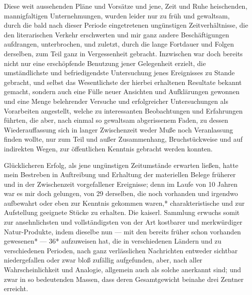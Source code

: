 \documentclass[a4paper, 11pt, oneside, german]{article}
\begin{document}
Diese weit aussehenden Pläne und Vorsätze und jene, Zeit und Ruhe heischenden, mannigfaltigen Unternehmungen, wurden leider nur zu früh und gewaltsam, durch die bald nach dieser Periode eingetretenen ungünstigen Zeitverhältnisse, die den literarischen Verkehr erschwerten und mir ganz andere Beschäftigungen aufdrangen, unterbrochen, und zuletzt, durch die lange Fortdauer und Folgen derselben, zum Teil ganz in Vergessenheit gebracht. Inzwischen war doch bereits nicht nur eine erschöpfende Benutzung jener Gelegenheit erzielt, die umständlichste und befriedigendste Untersuchung jenes Ereignisses zu Stande gebracht, und selbst das Wesentlichste der hierbei erhaltenen Resultate bekannt gemacht, sondern auch eine Fülle neuer Ansichten und Aufklärungen gewonnen und eine Menge belehrender Versuche und erfolgreicher Untersuchungen als Vorarbeiten angestellt, welche zu interessanten Beobachtungen und Erfahrungen führten, die aber, nach einmal so gewaltsam abgerissenem Faden, zu dessen Wiederauffassung sich in langer Zwischenzeit weder Muße noch Veranlassung finden wollte, nur zum Teil und außer Zusammenhang, Bruchstückweise und auf indirekten Wegen, zur öffentlichen Kenntnis gebracht werden konnten.

Glücklicheren Erfolg, als jene ungünstigen Zeitumstände erwarten ließen, hatte mein Bestreben in Auftreibung und Erhaltung der materiellen Belege früherer und in der Zwischenzeit vorgefallener Ereignisse; denn im Laufe von 10 Jahren war es mir doch gelungen, von 29 derselben, die noch vorhanden und irgendwo aufbewahrt oder eben zur Kenntnis gekommen waren,* charakteristische und zur Aufstellung geeignete Stücke zu erhalten. Die kaiserl. Sammlung erwuchs somit zur ansehnlichsten und vollständigsten von der Art kostbarer und merkwürdiger Natur-Produkte, indem dieselbe nun --- mit den bereits früher schon vorhanden gewesenen* --- 36* aufzuweisen hat, die in verschiedenen Ländern und zu verschiedenen Perioden, nach ganz verlässlichen Nachrichten entweder sichtbar niedergefallen oder zwar bloß zufällig aufgefunden, aber, nach aller Wahrscheinlichkeit und Analogie, allgemein auch als solche anerkannt sind; und zwar in so bedeutenden Massen, dass deren Gesamtgewicht beinahe drei Zentner erreicht.
\end{document}
